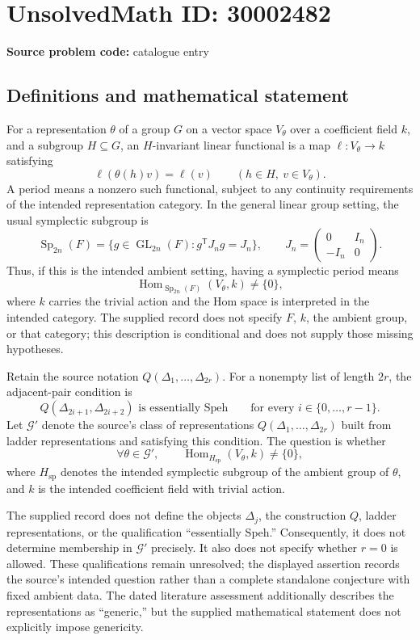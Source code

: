 \documentclass[11pt]{article}
\begin{document}
\section*{UnsolvedMath ID: 30002482}
\textbf{Source problem code:} catalogue entry
\subsection{Definitions and mathematical statement}
For a representation \(\theta\) of a group \(G\) on a vector space \(V_\theta\) over a coefficient field \(k\), and a subgroup \(H\subseteq G\), an \(H\)-invariant linear functional is a map \(\ell:V_\theta\to k\) satisfying
\[
\ell(\theta(h)v)=\ell(v)\qquad(h\in H,\ v\in V_\theta).
\]
A period means a nonzero such functional, subject to any continuity requirements of the intended representation category. In the general linear group setting, the usual symplectic subgroup is
\[
\operatorname{Sp}_{2n}(F)=\{g\in\operatorname{GL}_{2n}(F):g^{\mathsf T}J_ng=J_n\},\qquad
J_n=\begin{pmatrix}0&I_n\\-I_n&0\end{pmatrix}.
\]
Thus, if this is the intended ambient setting, having a symplectic period means
\[
\operatorname{Hom}_{\operatorname{Sp}_{2n}(F)}(V_\theta,k)\ne\{0\},
\]
where \(k\) carries the trivial action and the Hom space is interpreted in the intended category. The supplied record does not specify \(F\), \(k\), the ambient group, or that category; this description is conditional and does not supply those missing hypotheses.

Retain the source notation \(Q(\Delta_1,\ldots,\Delta_{2r})\). For a nonempty list of length \(2r\), the adjacent-pair condition is
\[
Q(\Delta_{2i+1},\Delta_{2i+2})\text{ is essentially Speh}
\qquad\text{for every }i\in\{0,\ldots,r-1\}.
\]
Let \(\mathcal G'\) denote the source's class of representations \(Q(\Delta_1,\ldots,\Delta_{2r})\) built from ladder representations and satisfying this condition. The question is whether
\[
\forall\theta\in\mathcal G',\qquad
\operatorname{Hom}_{H_{\mathrm{sp}}}(V_\theta,k)\ne\{0\},
\]
where \(H_{\mathrm{sp}}\) denotes the intended symplectic subgroup of the ambient group of \(\theta\), and \(k\) is the intended coefficient field with trivial action.

The supplied record does not define the objects \(\Delta_j\), the construction \(Q\), ladder representations, or the qualification ``essentially Speh.'' Consequently, it does not determine membership in \(\mathcal G'\) precisely. It also does not specify whether \(r=0\) is allowed. These qualifications remain unresolved; the displayed assertion records the source's intended question rather than a complete standalone conjecture with fixed ambient data. The dated literature assessment additionally describes the representations as ``generic,'' but the supplied mathematical statement does not explicitly impose genericity.
\end{document}
